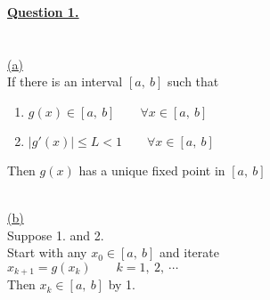 \documentclass[12pt]{article}
\begin{document}
\hyperlink{toc}{\LARGE \underline{\textbf{Question 1.}}}\\\\
~\\\hyperlink{toc}{\hypertarget{1.1}{(a)}}\\
If there is an interval $[a,\ b]$ such that
\begin{enumerate}
    \item $g(x) \in [a,\ b] \qquad \forall x\in [a,\ b]$
    \item $|g'(x)| \leq L < 1 \qquad \forall x\in [a,\ b]$
\end{enumerate}
Then $g(x)$ has a unique fixed point in $[a,\ b]$

~\\\hyperlink{toc}{\hypertarget{1.2}{(b)}}\\
Suppose 1. and 2. \\
Start with any $x_0\in [a,\ b]$ and iterate\\
$x_{k+1} = g(x_k) \qquad k = 1,\ 2,\ \cdots$\\

Then $x_k \in [a,\ b]$ by 1.\\
\end{document}
